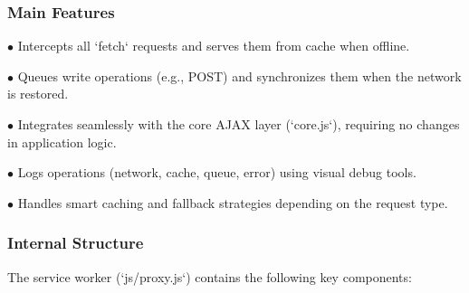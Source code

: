 \documentclass[a4paper]{article}
\begin{document}
\hypertarget{toc38}{}
\subsubsection{Main Features}

\begin{compactitem}
\item[\color{myblue}$\bullet$] Intercepts all `fetch` requests and serves them from cache when offline.
\item[\color{myblue}$\bullet$] Queues write operations (e.g., POST) and synchronizes them when the network is restored.
\item[\color{myblue}$\bullet$] Integrates seamlessly with the core AJAX layer (`core.js`), requiring no changes in application logic.
\item[\color{myblue}$\bullet$] Logs operations (network, cache, queue, error) using visual debug tools.
\item[\color{myblue}$\bullet$] Handles smart caching and fallback strategies depending on the request type.
\end{compactitem}

\hypertarget{toc39}{}
\subsubsection{Internal Structure}

The service worker (`js/proxy.js`) contains the following key components:
\end{document}
